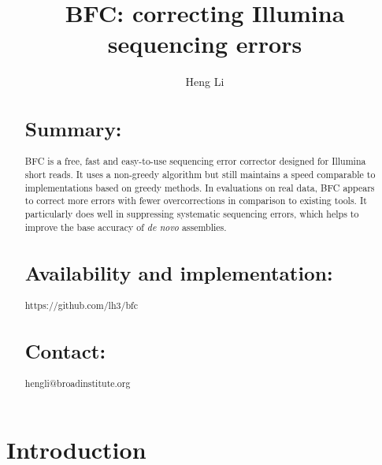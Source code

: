 \documentclass{bioinfo}
\begin{document}

\title[Error Correction for Illumina Data]{BFC: correcting Illumina sequencing errors}

\author[Li]{Heng Li}

\address{Broad Institute, 75 Ames Street, Cambridge, MA 02142, USA}

\maketitle

\begin{abstract}

\section{Summary:} BFC is a free, fast and easy-to-use sequencing error
corrector designed for Illumina short reads. It uses a non-greedy algorithm
but still maintains a speed comparable to implementations based on greedy
methods. In evaluations on real data, BFC appears to correct more errors with
fewer overcorrections in comparison to existing tools. It particularly does
well in suppressing systematic sequencing errors, which helps to improve the
base accuracy of {\it de novo} assemblies.

\section{Availability and implementation:} https://github.com/lh3/bfc

\section{Contact:} hengli@broadinstitute.org
\end{abstract}

\vspace{-1em}

\section{Introduction}
\end{document}
